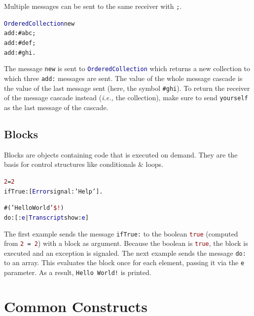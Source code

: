 \documentclass[notumble]{leaflet}
\makeatletter
\newcommand{\ie}{\emph{i.e.,}\xspace}
\newenvironment{displaycode}{%
     \par
     \hspace{1.5em}\begin{minipage}{\linewidth}
       \begin{alltt}\small}{
       \end{alltt}
     \end{minipage}
     \par}
\newcommand{\code}[1]{\foreignlanguage{english}{\texttt{#1}}}
\makeatother
\begin{document}
Multiple messages can be sent to the same receiver with \code{;}.

\begin{displaycode}
\textcolor{darkBlue}{OrderedCollection} new
  add: \textcolor{string}{#abc};
  add: \textcolor{string}{#def};
  add: \textcolor{string}{#ghi}.
\end{displaycode}

The message \code{new} is sent to \code{\textcolor{darkBlue}{OrderedCollection}} which
returns a new collection to which three
\code{add:} messages are sent. The value of the whole message cascade
is the value of the last message sent (here, the symbol
\textcolor{string}{\code{\#ghi}}). To return the receiver of the
message cascade instead (\ie the collection), make sure to send
\code{yourself} as the last message of the cascade.

\vspace{-0.3cm}
\subsection{Blocks}
Blocks are objects containing code that is executed on demand. They are the basis for control structures like
conditionals \& loops.

\begin{displaycode}
\textcolor{darkRed}{2} = \textcolor{darkRed}{2}
  ifTrue: [ \textcolor{darkBlue}{Error} signal: \textcolor{string}{'Help'} ].
\end{displaycode}
\begin{displaycode}
\#(\textcolor{string}{'Hello World'} \textcolor{darkRed}{\$!})
  do: [ :\textcolor{darkBlue}{e} | \textcolor{darkBlue}{Transcript} show: \textcolor{darkBlue}{e} ]
\end{displaycode}

The first example sends the message \code{ifTrue:} to the boolean
\textcolor{darkRed}{\code{true}} (computed from
\code{\textcolor{darkRed}{2} = \textcolor{darkRed}{2}}) with a block
as argument. Because the boolean is \textcolor{darkRed}{\code{true}},
the block is executed and an exception is signaled. The next example
sends the message \code{do:} to an array. This evaluates the block
once for each element, passing it via the \code{e} parameter. As a
result, \code{\textcolor{string}{Hello~World!}} is printed.


\section{Common Constructs}
\end{document}

